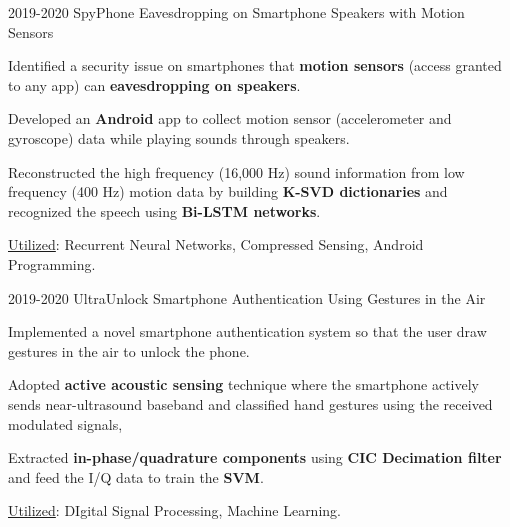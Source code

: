 \vspace{-.15in}
\vspace{-.05in}

\begin{cventries}
	
	\cvprojectentry
	{2019-2020 SpyPhone}
	{Eavesdropping on Smartphone Speakers with Motion Sensors}
	{
		\begin{cvitems} %
			\item Identified a security issue on smartphones that \textbf{motion sensors} (access granted to any app) can \textbf{eavesdropping on speakers}.
			\item Developed an \textbf{Android} app to collect motion sensor (accelerometer and gyroscope) data while playing sounds through speakers.
			\item Reconstructed the high frequency (16,000 Hz) sound information from  low frequency (400 Hz) motion data by building \textbf{K-SVD dictionaries} and recognized the speech using \textbf{Bi-LSTM networks}.
			\item  \underline{Utilized}: {Recurrent Neural Networks, Compressed Sensing, Android Programming.}
		\end{cvitems}
	}

	\cvprojectentry
	{2019-2020 UltraUnlock}
	{Smartphone Authentication Using Gestures in the Air}
	{
		\begin{cvitems} %
			\item Implemented a novel smartphone authentication system so that the user draw gestures in the air to unlock the phone.			
			\item Adopted \textbf{active acoustic sensing} technique where the smartphone actively sends near-ultrasound baseband and classified hand gestures using the received modulated signals, 			
			\item Extracted \textbf{in-phase/quadrature components} using \textbf{CIC Decimation filter} and feed the I/Q data to train the \textbf{SVM}.			
			\item  \underline{Utilized}: {DIgital Signal Processing, Machine Learning.}
		\end{cvitems}
	}
		

\end{cventries}
